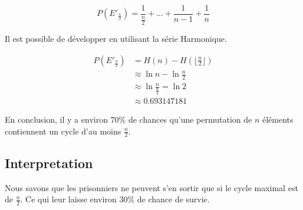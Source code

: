 	\begin{equation}
		P(E'_{\frac{n}{2}}) = \frac{1}{\frac{n}{2}} + \hdots + \frac{1}{n - 1} + \frac{1}{n}
	\end{equation}

	Il est possible de développer en utilisant la série Harmonique.

	\begin{align*}
		P(E'_{\frac{n}{2}}) & = H(n) - H(\lfloor \frac{n}{2} \rfloor)     \\
		                    & \approx \ln{n} - \ln{\frac{n}{2}}           \\
		                    & \approx \ln{\frac{n}{\frac{n}{2}}} = \ln{2} \\
		                    & \approx 0.693147181
	\end{align*}

	En conclusion, il y a environ 70\% de chances qu'une permutation de $n$ éléments contiennent un cycle d'au moins $\frac{n}{2}$.

\subsection{Interpretation}

	Nous savons que les prisonniers ne peuvent s'en sortir que si le cycle maximal est de $\frac{n}{2}$.
	Ce qui leur laisse environ 30\% de chance de survie.
